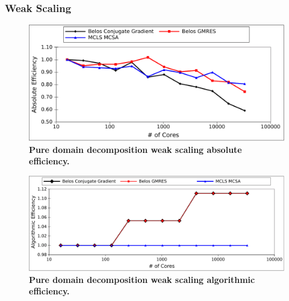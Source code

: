 \clearpage

\subsubsection{Weak Scaling}
\label{subsubsec:pure_weak}

\begin{figure}[htpb!]
  \begin{center}
    \includegraphics[width=6in]{chapters/parallel_mc/titan_weak_absolute.pdf}
  \end{center}
  \caption{\textbf{Pure domain decomposition weak scaling absolute
      efficiency.}}
  \label{fig:titan_weak_absolute}
\end{figure}

\begin{figure}[htpb!]
  \begin{center}
    \includegraphics[width=6in]{chapters/parallel_mc/titan_weak_alg_eff.pdf}
  \end{center}
  \caption{\textbf{Pure domain decomposition weak scaling algorithmic
      efficiency.}}
  \label{fig:titan_weak_algorithmic}
\end{figure}


